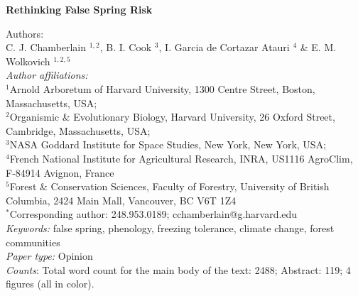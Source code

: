 \documentclass{article}\usepackage[]{graphicx}\usepackage[]{color}
\begin{document}
\noindent \textbf{\Large{Rethinking False Spring Risk}}

\noindent Authors:\\
C. J. Chamberlain $^{1,2}$, B. I. Cook $^{3}$, I. Garcia de Cortazar Atauri $^{4}$ \& E. M. Wolkovich $^{1,2,5}$
\vspace{2ex}\\
\emph{Author affiliations:}\\
$^{1}$Arnold Arboretum of Harvard University, 1300 Centre Street, Boston, Massachusetts, USA; \\
$^{2}$Organismic \& Evolutionary Biology, Harvard University, 26 Oxford Street, Cambridge, Massachusetts, USA; \\
$^{3}$NASA Goddard Institute for Space Studies, New York, New York, USA; \\
$^{4}$French National Institute for Agricultural Research, INRA, US1116 AgroClim, F-84914 Avignon, France\\
$^{5}$Forest \& Conservation Sciences, Faculty of Forestry, University of British Columbia, 2424 Main Mall, Vancouver, BC V6T 1Z4\\
\vspace{2ex}
$^*$Corresponding author: 248.953.0189; cchamberlain@g.harvard.edu\\

\noindent \emph{Keywords:} false spring, phenology, freezing tolerance, climate change, forest communities \\
\emph{Paper type:} Opinion\\
\emph{Counts}: Total word count for the main body of the text:  2488; Abstract: 119; 4 figures (all in color). \\

\renewcommand{\thetable}{\arabic{table}}
\renewcommand{\thefigure}{\arabic{figure}}
\renewcommand{\labelitemi}{$-$}


\newpage
\end{document}
